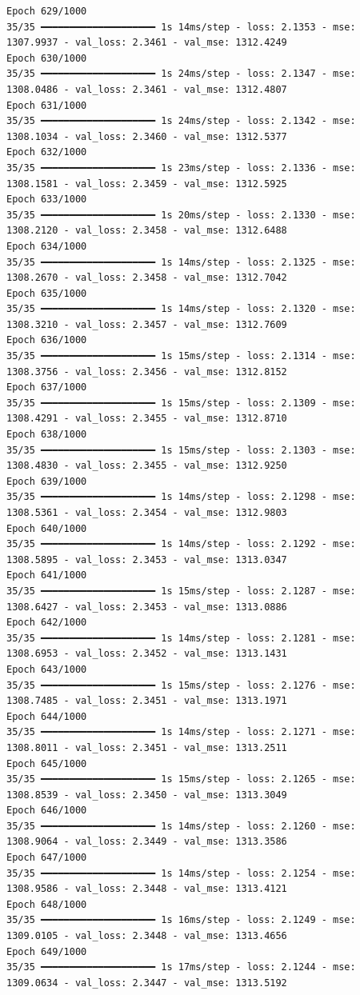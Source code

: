 \documentclass[
  letterpaper,
  DIV=11,
  numbers=noendperiod]{scrreprt}
\begin{document}
\begin{verbatim}
Epoch 629/1000
35/35 ━━━━━━━━━━━━━━━━━━━━ 1s 14ms/step - loss: 2.1353 - mse: 1307.9937 - val_loss: 2.3461 - val_mse: 1312.4249
Epoch 630/1000
35/35 ━━━━━━━━━━━━━━━━━━━━ 1s 24ms/step - loss: 2.1347 - mse: 1308.0486 - val_loss: 2.3461 - val_mse: 1312.4807
Epoch 631/1000
35/35 ━━━━━━━━━━━━━━━━━━━━ 1s 24ms/step - loss: 2.1342 - mse: 1308.1034 - val_loss: 2.3460 - val_mse: 1312.5377
Epoch 632/1000
35/35 ━━━━━━━━━━━━━━━━━━━━ 1s 23ms/step - loss: 2.1336 - mse: 1308.1581 - val_loss: 2.3459 - val_mse: 1312.5925
Epoch 633/1000
35/35 ━━━━━━━━━━━━━━━━━━━━ 1s 20ms/step - loss: 2.1330 - mse: 1308.2120 - val_loss: 2.3458 - val_mse: 1312.6488
Epoch 634/1000
35/35 ━━━━━━━━━━━━━━━━━━━━ 1s 14ms/step - loss: 2.1325 - mse: 1308.2670 - val_loss: 2.3458 - val_mse: 1312.7042
Epoch 635/1000
35/35 ━━━━━━━━━━━━━━━━━━━━ 1s 14ms/step - loss: 2.1320 - mse: 1308.3210 - val_loss: 2.3457 - val_mse: 1312.7609
Epoch 636/1000
35/35 ━━━━━━━━━━━━━━━━━━━━ 1s 15ms/step - loss: 2.1314 - mse: 1308.3756 - val_loss: 2.3456 - val_mse: 1312.8152
Epoch 637/1000
35/35 ━━━━━━━━━━━━━━━━━━━━ 1s 15ms/step - loss: 2.1309 - mse: 1308.4291 - val_loss: 2.3455 - val_mse: 1312.8710
Epoch 638/1000
35/35 ━━━━━━━━━━━━━━━━━━━━ 1s 15ms/step - loss: 2.1303 - mse: 1308.4830 - val_loss: 2.3455 - val_mse: 1312.9250
Epoch 639/1000
35/35 ━━━━━━━━━━━━━━━━━━━━ 1s 14ms/step - loss: 2.1298 - mse: 1308.5361 - val_loss: 2.3454 - val_mse: 1312.9803
Epoch 640/1000
35/35 ━━━━━━━━━━━━━━━━━━━━ 1s 14ms/step - loss: 2.1292 - mse: 1308.5895 - val_loss: 2.3453 - val_mse: 1313.0347
Epoch 641/1000
35/35 ━━━━━━━━━━━━━━━━━━━━ 1s 15ms/step - loss: 2.1287 - mse: 1308.6427 - val_loss: 2.3453 - val_mse: 1313.0886
Epoch 642/1000
35/35 ━━━━━━━━━━━━━━━━━━━━ 1s 14ms/step - loss: 2.1281 - mse: 1308.6953 - val_loss: 2.3452 - val_mse: 1313.1431
Epoch 643/1000
35/35 ━━━━━━━━━━━━━━━━━━━━ 1s 15ms/step - loss: 2.1276 - mse: 1308.7485 - val_loss: 2.3451 - val_mse: 1313.1971
Epoch 644/1000
35/35 ━━━━━━━━━━━━━━━━━━━━ 1s 14ms/step - loss: 2.1271 - mse: 1308.8011 - val_loss: 2.3451 - val_mse: 1313.2511
Epoch 645/1000
35/35 ━━━━━━━━━━━━━━━━━━━━ 1s 15ms/step - loss: 2.1265 - mse: 1308.8539 - val_loss: 2.3450 - val_mse: 1313.3049
Epoch 646/1000
35/35 ━━━━━━━━━━━━━━━━━━━━ 1s 14ms/step - loss: 2.1260 - mse: 1308.9064 - val_loss: 2.3449 - val_mse: 1313.3586
Epoch 647/1000
35/35 ━━━━━━━━━━━━━━━━━━━━ 1s 14ms/step - loss: 2.1254 - mse: 1308.9586 - val_loss: 2.3448 - val_mse: 1313.4121
Epoch 648/1000
35/35 ━━━━━━━━━━━━━━━━━━━━ 1s 16ms/step - loss: 2.1249 - mse: 1309.0105 - val_loss: 2.3448 - val_mse: 1313.4656
Epoch 649/1000
35/35 ━━━━━━━━━━━━━━━━━━━━ 1s 17ms/step - loss: 2.1244 - mse: 1309.0634 - val_loss: 2.3447 - val_mse: 1313.5192

\end{verbatim}
\end{document}
